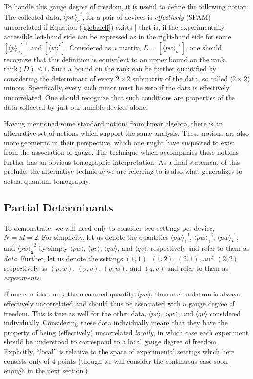 \documentclass[pra, 10pt, notitlepage, twocolumn]{revtex4-1}
\newcommand{\T}{\mathsf{T}}
\newcommand{\rank}{\mathrm{rank}}
\newcommand{\pref}[1]{(\ref{#1})}
\begin{document}
To handle this gauge degree of freedom, it is useful to define the following notion:
The collected data, ${\langle pw \rangle_a}^i$, for a pair of devices is \emph{effectively} (SPAM) uncorrelated if Equation \pref{globaleff} exists
| that is, if the experimentally accessible left-hand side can be expressed as in the right-hand side for some $\left[\langle p \rangle_a\right]^\T$ and $\left[\langle w \rangle^i\right]$.
Considered as a matrix, $D = [{\langle pw \rangle_a}^i]$, one should recognize that this definition is equivalent to an upper bound on the rank, $\rank(D)\le1$.
Such a bound on the rank can be further quantified by considering the determinant of every $2\times2$ submatrix of the data, so called ($2\times2$) minors.
Specifically, every such minor must be zero if the data is effectively uncorrelated.
One should recognize that such conditions are properties of the data collected by just our humble devices alone.


Having mentioned some standard notions from linear algebra, there is an alternative set of notions which support the same analysis.
These notions are also more geometric in their perspective, which one might have suspected to exist from the association of gauge.
The technique which accompanies these notions further has an obvious tomographic interpretation.
As a final statement of this prelude, the alternative technique we are referring to is also what generalizes to actual quantum tomography.




\subsection{Partial Determinants}\label{PD}

To demonstrate, we will need only to consider two settings per device, $N=M=2$.
For simplicity, let us denote the quantities ${\langle pw \rangle_1}^1$, ${\langle pw \rangle_1}^2$, ${\langle pw \rangle_2}^1$, and ${\langle pw \rangle_2}^2$
by simply $\langle pw \rangle$, $\langle pv \rangle$, $\langle qw \rangle$, and $\langle qv \rangle$, respectively and refer to them as \emph{data}.
Further, let us denote the settings $(1,1)$, $(1,2)$, $(2,1)$, and $(2,2)$ respectively as $(p,w)$, $(p,v)$, $(q,w)$, and $(q,v)$ and refer to them as \emph{experiments}. 

If one considers only the measured quantity ${\langle pw \rangle}$, then such a datum is always effectively uncorrelated and should thus be associated with a gauge degree of freedom.
This is true as well for the other data, $\langle pv \rangle$, $\langle qw \rangle$, and $\langle qv \rangle$ considered individually.
Considering these data individually means that they have the property of being (effectively) uncorrelated \emph{locally}, in which case each experiment should be understood to correspond to a local gauge degree of freedom.
Explicitly, ``local'' is relative to the space of experimental settings which here consists only of 4 points
(though we will consider the continuous case soon enough in the next section.)
\end{document}
